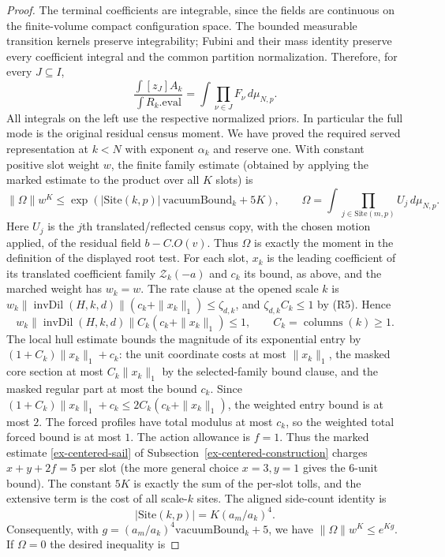 \begin{proof}
The terminal coefficients are integrable, since the fields are
continuous on the finite-volume compact configuration space. The
bounded measurable transition kernels preserve integrability; Fubini
and their mass identity preserve every coefficient integral and the
common partition normalization. Therefore, for every $J\subseteq I$,
\[
 \frac{\int[z_J]A_k}{\int R_k.\mathrm{eval}}
       =\int\prod_{\nu\in J}F_\nu\,d\mu_{N,p}.
\]
All integrals on the left use the respective normalized priors. In
particular the full mode is the original residual census moment.
We have proved the required served representation at $k<N$ with
exponent $\alpha_k$ and reserve one. With constant positive slot weight
$w$, the finite family estimate (obtained by applying the marked
estimate to the product over all $K$ slots) is
\[
 \|\Omega\|w^K\leq
   \exp\!\left(|\mathrm{Site}(k,p)|\,\mathrm{vacuumBound}_k+5K\right),
 \qquad
 \Omega=\int\prod_{j\in\mathrm{Site}(m,p)}U_j\,d\mu_{N,p}.
\]
Here $U_j$ is the $j$th translated/reflected census copy, with the chosen
motion applied, of the residual field $b-C.O(v)$. Thus $\Omega$ is exactly
the moment in the definition of the displayed root test.
For each slot, $x_k$ is the leading coefficient of its translated coefficient family
$\mathcal Z_k(-a)$ and $c_k$ its bound, as above, and the marched weight
has $w_k=w$. The rate clause at the opened scale $k$ is
$w_k\|\operatorname{invDil}(H,k,d)\|(c_k+\|x_k\|_1)\leq\zeta_{d,k}$, and
$\zeta_{d,k}C_k\leq1$ by (R5). Hence
\[
 w_k\|\operatorname{invDil}(H,k,d)\|C_k
       (c_k+\|x_k\|_1)\leq1,
 \qquad C_k=\operatorname{columns}(k)\geq1.
\]
The local hull estimate bounds the magnitude of its exponential entry by
$(1+C_k)\|x_k\|_1+c_k$: the unit coordinate costs at most $\|x_k\|_1$,
the masked core section at most $C_k\|x_k\|_1$ by the selected-family
bound clause, and the masked regular part at most the bound $c_k$. Since
$(1+C_k)\|x_k\|_1+c_k\leq2C_k(c_k+\|x_k\|_1)$, the weighted entry bound
is at most $2$. The forced profiles have total modulus at most $c_k$, so
the weighted total forced bound is at most $1$. The action allowance is
$f=1$. Thus the marked estimate \eqref{ex-centered-sail} of
Subsection~\ref{ex-centered-construction} charges $x+y+2f=5$ per slot (the
more general choice $x=3,y=1$ gives the $6$-unit bound). The constant
$5K$ is exactly the sum of the per-slot tolls, and the extensive term is the cost
of all scale-$k$ sites. The aligned side-count identity is
\[
 |\mathrm{Site}(k,p)|=K(a_m/a_k)^4.
\]
Consequently, with
$g=(a_m/a_k)^4\mathrm{vacuumBound}_k+5$, we have
$\|\Omega\|w^K\leq e^{Kg}$. If $\Omega=0$ the desired inequality is

\end{proof}
